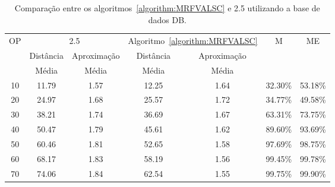 \begin{table}[!htb]
  \caption{Comparação entre os algoritmos~\ref{algorithm:MRFVALSC} e 2.5\SbIRT{} utilizando a base de dados DB\textsubscript{\SbIRTM}.}
  \label{table:CFCQOBJI}
  \centering
  \begin{tabular}{|c|c|c|c|c|c|c|}
  \hline
          \multirow{3}{*}{OP} &                \multicolumn{2}{c|}{2.5\SbIRTM{}}  & \multicolumn{2}{c|}{Algoritmo~\ref{algorithm:MRFVALSC}} &      \multirow{3}{*}{M} &     \multirow{3}{*}{ME} \\ \cline{2-5}
                              &               Distância &             Aproximação &                     Distância &             Aproximação &                         &                         \\
                              &                   Média &                   Média &                         Média &                   Média &                         &                         \\ \hline
  10                          &                   11.79 &                    1.57 &                         12.25 &                    1.64 &                 32.30\% &                 53.18\% \\ \hline
  20                          &                   24.97 &                    1.68 &                         25.57 &                    1.72 &                 34.77\% &                 49.58\% \\ \hline
  30                          &                   38.21 &                    1.74 &                         36.69 &                    1.67 &                 63.31\% &                 73.75\% \\ \hline
  40                          &                   50.47 &                    1.79 &                         45.61 &                    1.62 &                 89.60\% &                 93.69\% \\ \hline
  50                          &                   60.46 &                    1.81 &                         52.65 &                    1.58 &                 97.69\% &                 98.75\% \\ \hline
  60                          &                   68.17 &                    1.83 &                         58.19 &                    1.56 &                 99.45\% &                 99.78\% \\ \hline
  70                          &                   74.06 &                    1.84 &                         62.54 &                    1.55 &                 99.75\% &                 99.90\% \\ \hline

\end{tabular}
\end{table}
